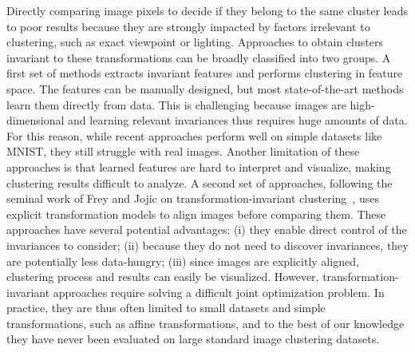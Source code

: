 \documentclass{article}
\begin{document}
Directly comparing image pixels to decide if they belong to the same cluster leads to poor 
results because they are strongly impacted by factors irrelevant to clustering, such as exact 
viewpoint or lighting. Approaches to obtain clusters invariant to these transformations can 
be broadly classified into two groups. A first set of methods extracts invariant features and 
performs clustering in feature space.  The features can be manually designed, but most 
state-of-the-art methods learn them directly from data. This is challenging because images 
are high-dimensional and learning relevant invariances thus requires huge amounts of data.  
For this reason, while recent approaches perform well on simple datasets like MNIST, they 
still struggle with real images. Another limitation of these approaches is that learned 
features are hard to interpret and visualize, making clustering results difficult to analyze. 
A second set of approaches, following the seminal work of Frey and Jojic on 
transformation-invariant clustering~\cite{freyEstimatingMixtureModels1999,
freyFastLargescaleTransformationinvariant2002, 
freyTransformationinvariantClusteringUsing2003}, uses explicit transformation models to align 
images before comparing them. These approaches have several potential advantages: (i) they 
enable direct control of the invariances to consider; (ii) because they do not need to 
discover invariances, they are potentially less data-hungry; (iii) since images are 
explicitly aligned, clustering process and results can easily be visualized.  However, 
transformation-invariant approaches require solving a difficult joint optimization problem.  
In practice, they are thus often limited to small datasets and simple transformations, such 
as affine transformations, and to the best of our knowledge they have never been evaluated on 
large standard image clustering datasets.
\end{document}

